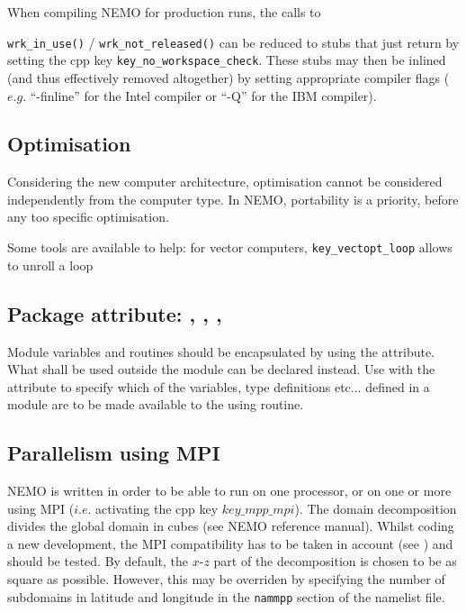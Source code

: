 \documentclass{article}
\begin{document}
When compiling NEMO for production runs,
the calls to {\texttt{wrk\_in\_use()} / \texttt{wrk\_not\_released()} can be reduced to stubs that just
return  by setting the cpp key \texttt{key\_no\_workspace\_check}.
These stubs may then be inlined (and thus effectively removed altogether) by setting appropriate compiler flags
($e.g.$ ``-finline'' for the Intel compiler or ``-Q'' for the IBM compiler).

\subsection{Optimisation}

Considering the new computer architecture, optimisation cannot be considered independently from the computer type.
In NEMO, portability is a priority, before any too specific optimisation.

Some tools are available to help: for vector computers, \texttt{key\_vectopt\_loop} allows to unroll a loop

\subsection{Package attribute: , , , }

Module variables and routines should be encapsulated by using the  attribute.
What shall be used outside the module can be declared  instead.
Use  with the  attribute to specify which of the variables, type definitions etc...
defined in a module are to be made available to the using routine.

\subsection {Parallelism using MPI}

NEMO is written in order to be able to run on one processor, or on one or more using MPI
($i.e.$ activating the cpp key $key\_mpp\_mpi$).
The domain decomposition divides the global domain in cubes (see NEMO reference manual).
Whilst coding a new development, the MPI compatibility has to be taken in account
(see ) and should be tested.
By default, the $x$-$z$ part of the decomposition is chosen to be as square as possible.
However, this may be overriden by specifying the number of subdomains in latitude and longitude in
the \texttt{nammpp} section of the namelist file.

}
\end{document}
